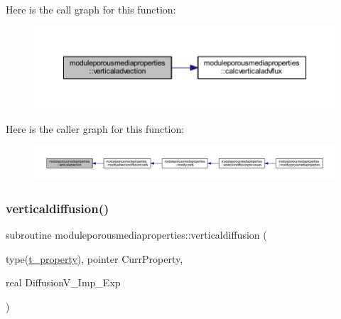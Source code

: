 Here is the call graph for this function\+:\nopagebreak
\begin{figure}[H]
\begin{center}
\leavevmode
\includegraphics[width=350pt]{namespacemoduleporousmediaproperties_a0872f72bfebe157c1a7a7030f27bf43c_cgraph}
\end{center}
\end{figure}
Here is the caller graph for this function\+:\nopagebreak
\begin{figure}[H]
\begin{center}
\leavevmode
\includegraphics[width=350pt]{namespacemoduleporousmediaproperties_a0872f72bfebe157c1a7a7030f27bf43c_icgraph}
\end{center}
\end{figure}
\mbox{\label{namespacemoduleporousmediaproperties_a872ba647c81cc1f00e69bd02b7418258}} 
\subsubsection{\texorpdfstring{verticaldiffusion()}{verticaldiffusion()}}
{\footnotesize\ttfamily subroutine moduleporousmediaproperties\+::verticaldiffusion (\begin{DoxyParamCaption}\item[{type(\mbox{\hyperlink{structmoduleporousmediaproperties_1_1t__property}{t\+\_\+property}}), pointer}]{Curr\+Property,  }\item[{real}]{Diffusion\+V\+\_\+\+Imp\+\_\+\+Exp }\end{DoxyParamCaption})\hspace{0.3cm}{\ttfamily [private]}}

